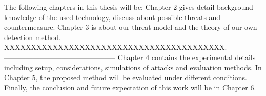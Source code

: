 The following chapters in this thesis will be: Chapter 2 gives detail background knowledge of the used technology, discuss about possible threats and countermeasure. Chapter 3 is about our threat model and the theory of our own detection method. XXXXXXXXXXXXXXXXXXXXXXXXXXXXXXXXXXXXXXXXX.
-----------------------------------------------
Chapter 4 contains the experimental details including setup, considerations, simulations of attacks and evaluation methods. In Chapter 5, the proposed method will be evaluated under different conditions. Finally, the conclusion and future expectation of this work will be in Chapter 6.